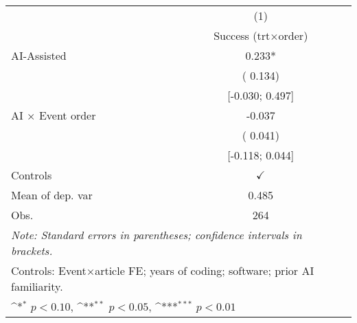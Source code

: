\def\sym#1{\ifmmode^{#1}\else\(^{#1}\)\fi}
\begin{tabular}{l*{1}{c}}
\hline\hline
 & (1)
\\
 & Success (trt×order)
 \\
\hline
AI-Assisted &  0.233*
\\
 & ( 0.134)
\\
 & [-0.030;  0.497]
\\
AI × Event order & -0.037
\\
 & ( 0.041)
\\
 & [-0.118;  0.044]
\\
\hline
Controls & $\checkmark$
\\
Mean of dep. var &  0.485
\\
Obs. & 264
\\
\hline
\hline\hline
\multicolumn{2}{l}{\it{Note:} Standard errors in parentheses; confidence intervals in brackets.}\\
\multicolumn{2}{l}{Controls: Event×article FE; years of coding; software; prior AI familiarity.}\\
\multicolumn{2}{l}{\sym{*} $p<0.10$, \sym{**} $p<0.05$,  \sym{***} $p<0.01$}\\
\end{tabular}
